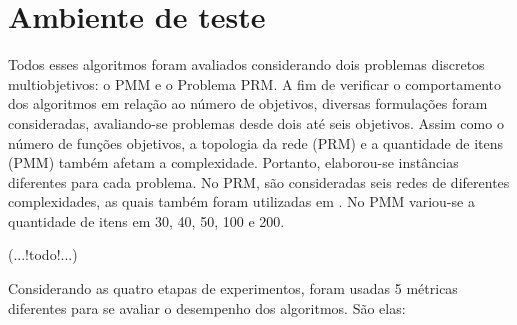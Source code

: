 \section{Ambiente de teste}

Todos esses algoritmos foram avaliados considerando dois problemas discretos multiobjetivos: o \ac{PMM} e o Problema \ac{PRM}. A fim  de verificar o comportamento dos algoritmos em relação ao número de objetivos, diversas formulações foram consideradas, avaliando-se problemas desde dois até seis objetivos. Assim como o número de funções objetivos, a topologia da rede (PRM) e a quantidade de itens (PMM) também afetam a complexidade. Portanto, elaborou-se instâncias diferentes para cada problema. No PRM, são consideradas seis redes de diferentes complexidades, as quais também foram utilizadas em \cite{LafetaThesis}. No PMM variou-se a quantidade de itens em 30, 40, 50, 100 e 200.

(...!todo!...)

Considerando as quatro etapas de experimentos, foram usadas 5 métricas diferentes para se avaliar o desempenho dos algoritmos. São elas:

